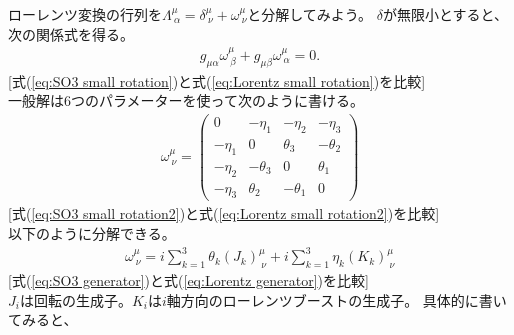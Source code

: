 \documentclass[10pt,a4paper]{jarticle}
\begin{document}
ローレンツ変換の行列を$\Lambda^\mu_{~\alpha} = \delta^\mu_{~\nu} + \omega^\mu_{~\nu}$と分解してみよう。
$\delta$が無限小とすると、次の関係式を得る。
\begin{align}
g_{\mu\alpha} \omega^\mu_{~\beta} + g_{\mu\beta} \omega^\mu_{~\alpha} = 0. \label{eq:Lorentz small rotation}
\end{align}
[式(\ref{eq:SO3 small rotation})と式(\ref{eq:Lorentz small rotation})を比較]\\
%
一般解は6つのパラメーターを使って次のように書ける。
\begin{align}
\omega^\mu_{~\nu}
=
\left(\begin{array}{cccc}
0 & -\eta_1 & -\eta_2 & -\eta_3 \\
-\eta_1 & 0 & \theta_3 & -\theta_2 \\
-\eta_2 & -\theta_3 & 0 & \theta_1 \\
-\eta_3 & \theta_2 & -\theta_1 & 0
\end{array}\right) \label{eq:Lorentz small rotation2}
\end{align}
[式(\ref{eq:SO3 small rotation2})と式(\ref{eq:Lorentz small rotation2})を比較]\\
%
以下のように分解できる。
\begin{align}
\omega^\mu_{~\nu} = i \sum_{k=1}^3 \theta_k (J_k)^\mu_{~\nu} + i \sum_{k=1}^3 \eta_k (K_k)^\mu_{~\nu} \label{eq:Lorentz generator}
\end{align}
[式(\ref{eq:SO3 generator})と式(\ref{eq:Lorentz generator})を比較]\\
%
$J_i$は回転の生成子。$K_i$は$i$軸方向のローレンツブーストの生成子。
具体的に書いてみると、
\end{document}
